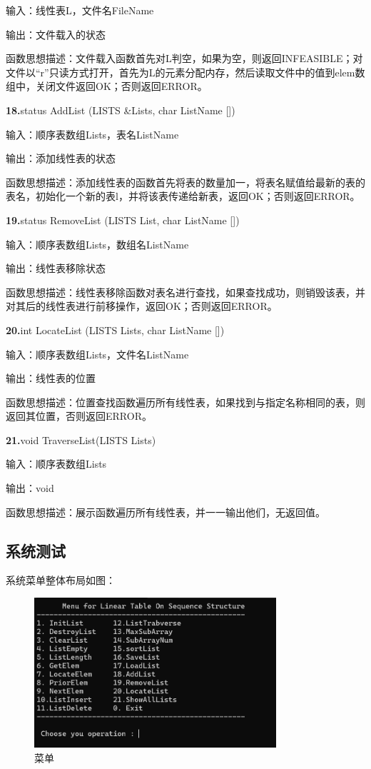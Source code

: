 \documentclass[supercite]{Experimental_Report}
\theoremstyle{definition}
\begin{document}
输入：线性表L，文件名FileName

输出：文件载入的状态

函数思想描述：文件载入函数首先对L判空，如果为空，则返回INFEASIBLE；对文件以“r”只读方式打开，首先为L的元素分配内存，然后读取文件中的值到elem数组中，关闭文件返回OK；否则返回ERROR。

\noindent\textbf{18.}status AddList (LISTS \&Lists, char ListName [])

输入：顺序表数组Lists，表名ListName

输出：添加线性表的状态

函数思想描述：添加线性表的函数首先将表的数量加一，将表名赋值给最新的表的表名，初始化一个新的表l，并将该表传递给新表，返回OK；否则返回ERROR。

\noindent\textbf{19.}status RemoveList (LISTS List, char ListName [])

输入：顺序表数组Lists，数组名ListName

输出：线性表移除状态

函数思想描述：线性表移除函数对表名进行查找，如果查找成功，则销毁该表，并对其后的线性表进行前移操作，返回OK；否则返回ERROR。

\noindent\textbf{20.}int LocateList (LISTS Lists, char ListName [])

输入：顺序表数组Lists，文件名ListName

输出：线性表的位置

函数思想描述：位置查找函数遍历所有线性表，如果找到与指定名称相同的表，则返回其位置，否则返回ERROR。

\noindent\textbf{21.}void TraverseList(LISTS Lists)

输入：顺序表数组Lists

输出：void

函数思想描述：展示函数遍历所有线性表，并一一输出他们，无返回值。

\subsection{系统测试}

系统菜单整体布局如图：

 \begin{figure}[H]
 	\centering
 	\includegraphics[width=0.8\textwidth]{images/菜单.png}
 	\caption{菜单}
 	\label{txlab}
 \end{figure}
\end{document}
